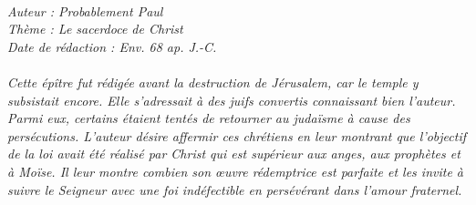 \BFont
\noindent\hrulefill
{\footnotesize
\textit{
\bigskip
{\centering{}
\\Auteur : Probablement Paul
\\Thème : Le sacerdoce de Christ
\\Date de rédaction : Env. 68 ap. J.-C.\\}
}
\textit{
\\Cette épître fut rédigée avant la destruction de Jérusalem, car le temple y subsistait encore. Elle s’adressait à des juifs
convertis connaissant bien l’auteur. Parmi eux, certains étaient tentés de retourner au judaïsme à cause des persécutions. L’auteur désire affermir ces chrétiens en leur montrant que l’objectif de la loi avait été réalisé par Christ qui est supérieur aux anges, aux prophètes et à Moïse. Il leur montre combien son œuvre rédemptrice est parfaite et les invite à suivre le Seigneur avec une foi indéfectible en persévérant dans l’amour fraternel.\bigskip
}
}
\par\nobreak\noindent\hrulefill
